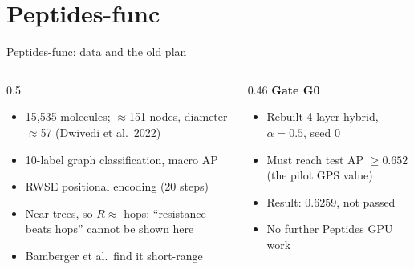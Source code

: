 \documentclass[aspectratio=169,10pt]{beamer}
\newcommand{\snote}[1]{{\scriptsize\textcolor{ink!70}{#1}}}
\begin{document}
\section{Peptides-func}

\begin{frame}{Peptides-func: data and the old plan}
  \begin{columns}[T]
    \begin{column}{0.5\textwidth}
      \begin{itemize}\small
        \item 15,535 molecules; $\approx$151 nodes, diameter $\approx$57 \snote{(Dwivedi et al.\ 2022)}
        \item 10-label graph classification, macro AP
        \item RWSE positional encoding (20 steps)
        \item Near-trees, so $R \approx$ hops: ``resistance beats hops'' cannot be shown here
        \item Bamberger et al.\ find it short-range
      \end{itemize}
    \end{column}
    \begin{column}{0.46\textwidth}
      \textbf{Gate G0}
      \begin{itemize}\small
        \item Rebuilt 4-layer hybrid, $\alpha=0.5$, seed 0
        \item Must reach test AP $\ge 0.652$ (the pilot GPS value)
        \item Result: \alert{0.6259}, not passed
        \item No further Peptides GPU work
      \end{itemize}
    \end{column}
  \end{columns}
\end{frame}
\end{document}

